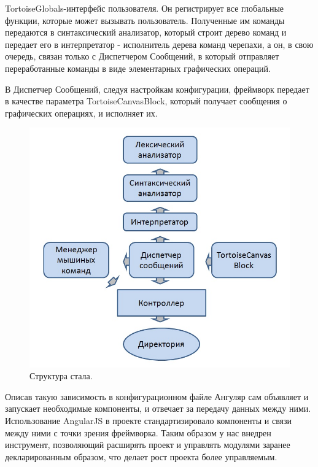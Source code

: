 TortoiseGlobals-интерфейс пользователя. Он регистрирует все глобальные функции, которые может вызывать пользователь. Полученные им команды передаются в синтаксический анализатор, который строит дерево команд и передает его в интерпретатор - исполнитель дерева команд черепахи, а он, в свою очередь,  связан только с Диспетчером Сообщений, в который отправляет переработанные команды в виде элементарных графических операций.

В Диспетчер Сообщений, следуя настройкам конфигурации, фреймворк передает в качестве параметра TortoiseCanvasBlock, который получает сообщения о графических операциях, и исполняет их.

\vspace{6mm}
\begin{figure} [h] 
  \center
  \includegraphics [scale=0.50,natwidth=826,natheight=645] {images/struct_new.jpg}
  \caption{Структура стала.} 
  \label{img:struct_new}  
\end{figure}
\vspace{6mm}

Описав такую зависимость в конфигурационном файле Ангуляр сам объявляет и запускает необходимые компоненты, и отвечает за передачу данных между ними. Использование AngularJS в проекте стандартизировало компоненты и связи между ними с точки зрения фреймворка. Таким образом у нас внедрен инструмент, позволяющий расширять проект и управлять модулями заранее декларированным образом, что делает рост проекта более управляемым.


\clearpage